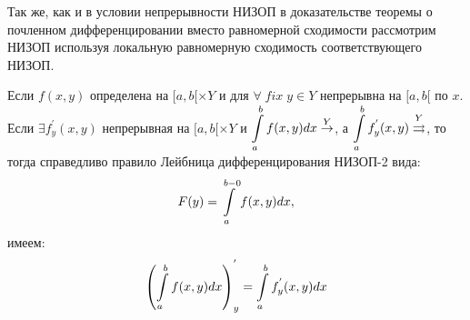     \begin{note}
    	Так же, как и в условии непрерывности НИЗОП в доказательстве теоремы о почленном
    	дифференцировании вместо равномерной сходимости рассмотрим НИЗОП используя локальную
    	равномерную сходимость соответствующего НИЗОП.
    \end{note}
    
    \begin{theorem}
    	Если $f(x,y)$ определена на $[a, b[ \times Y$ и для $\forall \; fix \; y \in Y$ непрерывна на $[a, b[$ по $x$. Если $\exists f^{'}_y(x,y)$ непрерывная на $[a, b[ \times Y$ и $\displaystyle\int\limits_a^b f(x,y)dx \overset{Y}{\to}$, а $\displaystyle\int\limits_a^b f^{'}_y(x,y) \overset{Y}{\rightrightarrows}$, то тогда справедливо правило Лейбница дифференцирования НИЗОП-2 вида:
    	\begin{equation*}
    	F(y) = \displaystyle\int\limits_a^{b-0} f(x,y)dx,
    	\end{equation*}
    	имеем:
    	\begin{equation*}
    	\left( \displaystyle\int\limits_a^b f(x,y)dx \right)^{'}_{y} = \displaystyle\int\limits_a^b f^{'}_y (x,y)dx
    	\end{equation*}
    \end{theorem}
